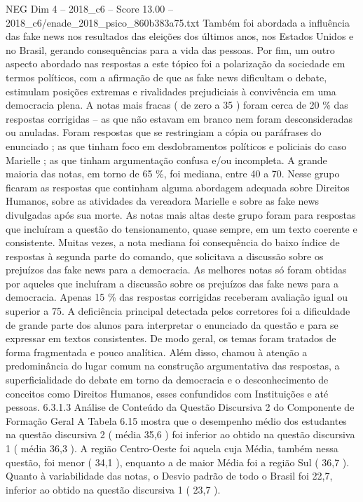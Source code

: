 \begin{textsample}{NEG Dim 4 – 2018\_c6 – Score 13.00 – 2018\_c6/enade\_2018\_psico\_860b383a75.txt}
Também foi abordada a influência das fake news nos resultados das eleições dos últimos anos, nos Estados Unidos e no Brasil, gerando consequências para a vida das pessoas.
Por fim, um outro aspecto abordado nas respostas a este tópico foi a polarização da sociedade em termos políticos, com a afirmação de que as fake news dificultam o debate, estimulam posições extremas e rivalidades prejudiciais à convivência em uma democracia plena.
A notas mais fracas ( de zero a 35 ) foram cerca de 20 \% das respostas corrigidas – as que não estavam em branco nem foram desconsideradas ou anuladas.
Foram respostas que se restringiam a cópia ou paráfrases do enunciado ; as que tinham foco em desdobramentos políticos e policiais do caso Marielle ; as que tinham argumentação confusa e/ou incompleta.
A grande maioria das notas, em torno de 65 \%, foi mediana, entre 40 a 70.
Nesse grupo ficaram as respostas que continham alguma abordagem adequada sobre Direitos Humanos, sobre as atividades da vereadora Marielle e sobre as fake news divulgadas após sua morte.
As notas mais altas deste grupo foram para respostas que incluíram a questão do tensionamento, quase sempre, em um texto coerente e consistente.
Muitas vezes, a nota mediana foi consequência do baixo índice de respostas à segunda parte do comando, que solicitava a discussão sobre os prejuízos das fake news para a democracia.
As melhores notas só foram obtidas por aqueles que incluíram a discussão sobre os prejuízos das fake news para a democracia.
Apenas 15 \% das respostas corrigidas receberam avaliação igual ou superior a 75.
A deficiência principal detectada pelos corretores foi a dificuldade de grande parte dos alunos para interpretar o enunciado da questão e para se expressar em textos consistentes.
De modo geral, os temas foram tratados de forma fragmentada e pouco analítica.
Além disso, chamou à atenção a predominância do lugar comum na construção argumentativa das respostas, a superficialidade do debate em torno da democracia e o desconhecimento de conceitos como Direitos Humanos, esses confundidos com Instituições e até pessoas. 6.3.1.3 Análise de Conteúdo da Questão Discursiva 2 do Componente de Formação Geral A Tabela 6.15 mostra que o desempenho médio dos estudantes na questão discursiva 2 ( média 35,6 ) foi inferior ao obtido na questão discursiva 1 ( média 36,3 ).
A região Centro-Oeste foi aquela cuja Média, também nessa questão, foi menor ( 34,1 ), enquanto a de maior Média foi a região Sul ( 36,7 ).
Quanto à variabilidade das notas, o Desvio padrão de todo o Brasil foi 22,7, inferior ao obtido na questão discursiva 1 ( 23,7 ).

\end{textsample}
